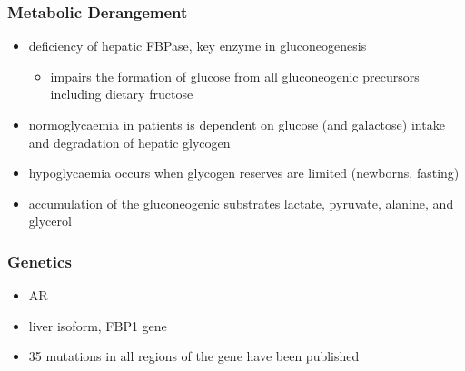 \documentclass{scrartcl}
\begin{document}
\subsubsection{Metabolic Derangement}
\label{sec:org8e4acbc}
\begin{itemize}
\item deficiency of hepatic FBPase, key enzyme in gluconeogenesis
\begin{itemize}
\item impairs the formation of glucose from all gluconeogenic precursors including dietary fructose
\end{itemize}
\item normoglycaemia in patients is dependent on glucose (and galactose)
intake and degradation of hepatic glycogen
\item hypoglycaemia occurs when glycogen reserves are limited (newborns, fasting)
\item accumulation of the gluconeogenic substrates lactate, pyruvate, alanine, and glycerol
\end{itemize}
\subsubsection{Genetics}
\label{sec:org3814f94}
\begin{itemize}
\item AR
\item liver isoform, FBP1 gene
\item 35 mutations in all regions of the gene have been published
\end{itemize}
\end{document}
